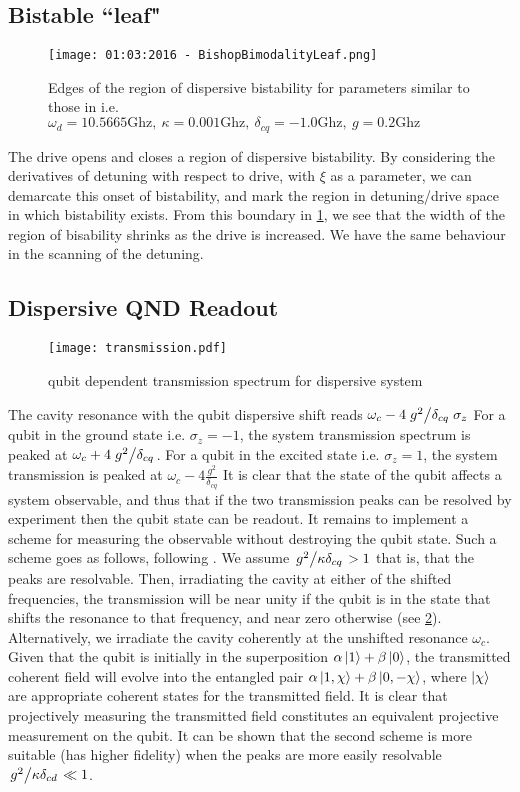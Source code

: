 \subsection{Bistable ``leaf"}
\begin{figure}[!htb]
        \texttt{[image: 01:03:2016 - BishopBimodalityLeaf.png]}
        \caption{Edges of the region of dispersive bistability for parameters similar to those in \cite{Bishop2010} i.e. $\omega_d = 10.5665\text{Ghz}, \  \kappa = 0.001 \text{Ghz}, \  \delta_{cq} = -1.0 \text{Ghz}, \  g = 0.2\text{Ghz}$ }
        \label{BistabilityLeaf}
\end{figure}
The drive opens and closes a region of dispersive bistability. By considering the derivatives of detuning with respect to drive, with $\xi$ as a parameter, we can demarcate this onset of bistability, and mark the region in detuning/drive space in which bistability exists.
From this boundary in \cref{BistabilityLeaf}, we see that the width of the region of bisability shrinks as the drive is increased. We have the same behaviour in the scanning of the detuning.
\subsection{Dispersive QND Readout}
\label{disp_QND_readout}
\begin{figure}[ht]
  \centering
  \texttt{[image: transmission.pdf]}
  \caption{qubit dependent transmission spectrum for dispersive system}
  \label{transmission}
\end{figure}
The cavity resonance with the qubit dispersive shift reads $\omega_c - 4\flatfrac{g^2}{\delta_{cq}}\sigma_z$
For a qubit in the ground state i.e. $\sigma_z = -1$, the system transmission spectrum is peaked at $\omega_c + 4\flatfrac{g^2}{\delta_{cq}}$.
For a qubit in the excited state i.e. $\sigma_z = 1$, the system transmission is peaked at $\omega_c - 4\frac{g^2}{\delta_{cq}}$
It is clear that the state of the qubit affects a system observable, and thus that if the two transmission peaks can be resolved by experiment then the qubit state can be readout.
It remains to  implement a scheme for measuring the observable without destroying the qubit state. 
Such a scheme goes as follows, following \cite{Blais2004a}.
We assume $\flatfrac{g^2}{\kappa\delta_{cq}} >1$ that is, that the peaks are resolvable.
Then, irradiating the cavity at either of the shifted frequencies, the transmission will be near unity if the qubit is in the state that shifts the resonance to that frequency, and near zero otherwise (see \cref{transmission}).
Alternatively, we irradiate the cavity coherently at the unshifted resonance $\omega_c$. 
Given that the qubit is initially in the superposition $\alpha \ket{1} + \beta \ket{0}$, the transmitted coherent field will evolve into the entangled pair $\alpha \ket{1, \chi} + \beta \ket{0, -\chi}$, where $\ket{\chi}$ are appropriate coherent states for the transmitted field. 
It is clear that projectively measuring the transmitted field constitutes an equivalent projective measurement on the qubit.
It can be shown \cite{Blais2004a} that the second scheme is more suitable (has higher fidelity) when the peaks are more easily resolvable $\flatfrac{g^2}{\kappa\delta_{cd}} \ll 1$.
